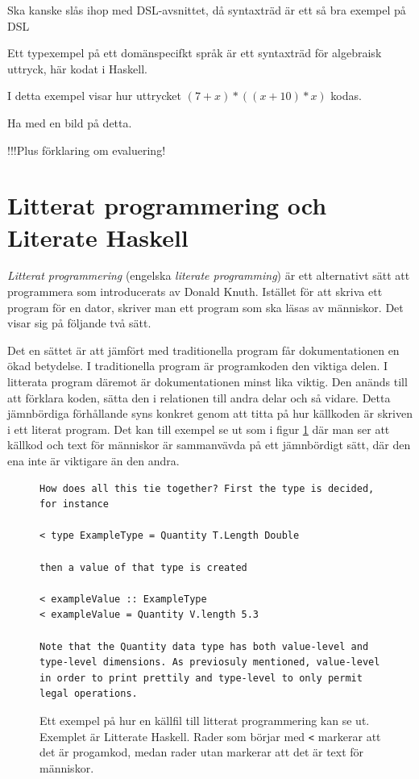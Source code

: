 Ska kanske slås ihop med DSL-avsnittet, då syntaxträd är ett så bra exempel på DSL

Ett typexempel på ett domänspecifkt språk är ett syntaxträd för algebraisk uttryck, här kodat i Haskell.



I detta exempel visar hur uttrycket $(7+x)*((x+10)*x)$ kodas.

Ha med en bild på detta.

!!!Plus förklaring om evaluering!




\section{Litterat programmering och Literate Haskell}
\label{sec:lhs}
\begin{draft}
\textit{Litterat programmering} (engelska \textit{literate programming}) är ett
alternativt sätt att programmera som introducerats av Donald Knuth.\cite{knuth}
Istället för att skriva ett program för en dator, skriver man ett program som
ska läsas av människor. Det visar sig på följande två sätt.

Det en sättet är att jämfört med traditionella program får dokumentationen en
ökad betydelse. I traditionella program är programkoden den viktiga delen. I
litterata program däremot är dokumentationen minst lika viktig. Den anänds till
att förklara koden, sätta den i relationen till andra delar och så vidare.
Detta jämnbördiga förhållande syns konkret genom att titta på hur källkoden är
skriven i ett literat program. Det kan till exempel se ut som i figur
\ref{fig:litterate_haskell_exempel} där man ser att källkod och text för
människor är sammanvävda på ett jämnbördigt sätt, där den ena inte är viktigare
än den andra.

\begin{figure}[tph]
  \begin{lstlisting}[language={}]
How does all this tie together? First the type is decided, for instance

< type ExampleType = Quantity T.Length Double

then a value of that type is created

< exampleValue :: ExampleType
< exampleValue = Quantity V.length 5.3

Note that the Quantity data type has both value-level and type-level dimensions. As previosuly mentioned, value-level in order to print prettily and type-level to only permit legal operations.
  \end{lstlisting}
  \caption{Ett exempel på hur en källfil till litterat programmering kan se ut. Exemplet är Litterate Haskell. Rader som börjar med \texttt{<} markerar att det är progamkod, medan rader utan markerar att det är text för människor.}
  \label{fig:litterate_haskell_exempel}
\end{figure}


\end{draft}
